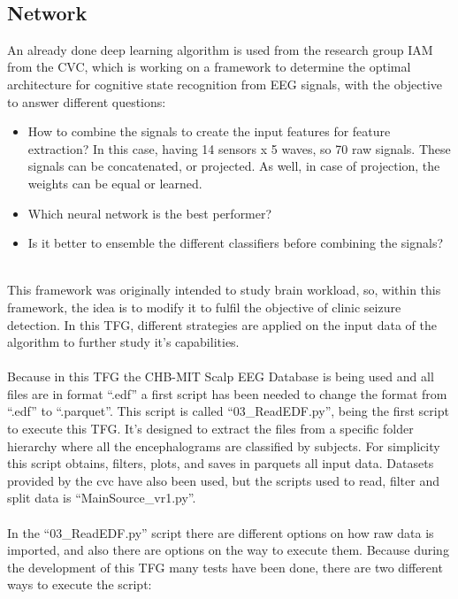 \leavevmode\\
\subsection{Network}
An already done deep learning algorithm is used from the research group IAM from the CVC, which is working on a framework to determine the optimal architecture for cognitive state recognition from EEG signals, with the objective to answer different questions:
\\
\begin{itemize}
\item How to combine the signals to create the input features for feature extraction? In this case, having 14 sensors x 5 waves, so 70 raw signals. These signals can be concatenated, or projected. As well, in case of projection, the weights can be equal or learned.
\item Which neural network is the best performer?
\item Is it better to ensemble the different classifiers before combining the signals?
\end{itemize}
\leavevmode\\
This framework was originally intended to study brain workload, so, within this framework, the idea is to modify it to fulfil the objective of clinic seizure detection. In this TFG, different strategies are applied on the input data of the algorithm to further study it’s capabilities.
\\\\
Because in this TFG the CHB-MIT Scalp EEG Database is being used and all files are in format “.edf” a first script has been needed to change the format from “.edf” to “.parquet”. This script is called “03\_ReadEDF.py”, being the first script to execute this TFG. It’s designed to extract the files from a specific folder hierarchy where all the encephalograms are classified by subjects. For simplicity this script obtains, filters, plots, and saves in parquets all input data. Datasets provided by the cvc have also been used, but the scripts used to read, filter and split data is “MainSource\_vr1.py”.
\\\\
In the “03\_ReadEDF.py” script there are different options on how raw data is imported, and also there are options on the way to execute them. Because during the development of this TFG many tests have been done, there are two different ways to execute the script:
\\\\
